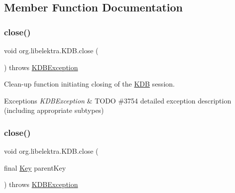\subsection{Member Function Documentation}
\mbox{\label{classorg_1_1libelektra_1_1KDB_ad3dcc3e348d1c841c7eda0bb00c54167}} 
\subsubsection{\texorpdfstring{close()}{close()}\hspace{0.1cm}{\footnotesize\ttfamily [1/2]}}
{\footnotesize\ttfamily void org.\+libelektra.\+K\+D\+B.\+close (\begin{DoxyParamCaption}{ }\end{DoxyParamCaption}) throws \hyperlink{classorg_1_1libelektra_1_1exception_1_1KDBException}{K\+D\+B\+Exception}\hspace{0.3cm}{\ttfamily [inline]}}



Clean-\/up function initiating closing of the \hyperlink{classorg_1_1libelektra_1_1KDB}{K\+DB} session. 


\begin{DoxyExceptions}{Exceptions}
{\em K\+D\+B\+Exception} & T\+O\+DO \#3754 detailed exception description (including appropriate subtypes) \\
\hline
\end{DoxyExceptions}
\mbox{\label{classorg_1_1libelektra_1_1KDB_af6b472eadf78ba4ed216303b52ddb29e}} 
\subsubsection{\texorpdfstring{close()}{close()}\hspace{0.1cm}{\footnotesize\ttfamily [2/2]}}
{\footnotesize\ttfamily void org.\+libelektra.\+K\+D\+B.\+close (\begin{DoxyParamCaption}\item[{final \hyperlink{classorg_1_1libelektra_1_1Key}{Key}}]{parent\+Key }\end{DoxyParamCaption}) throws \hyperlink{classorg_1_1libelektra_1_1exception_1_1KDBException}{K\+D\+B\+Exception}\hspace{0.3cm}{\ttfamily [inline]}}



